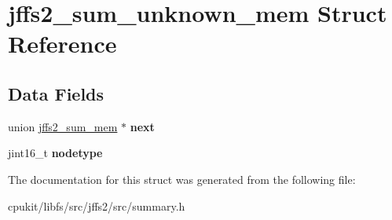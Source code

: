 \hypertarget{structjffs2__sum__unknown__mem}{}\section{jffs2\+\_\+sum\+\_\+unknown\+\_\+mem Struct Reference}
\label{structjffs2__sum__unknown__mem}
\subsection*{Data Fields}
\begin{DoxyCompactItemize}
\item 
\mbox{\label{structjffs2__sum__unknown__mem_a75c6041d8b330f5a0ff68e0cedff107e}} 
union \mbox{\hyperlink{unionjffs2__sum__mem}{jffs2\+\_\+sum\+\_\+mem}} $\ast$ {\bfseries next}
\item 
\mbox{\label{structjffs2__sum__unknown__mem_ad4d332da4bf50da59d339eb37f0ae9f7}} 
jint16\+\_\+t {\bfseries nodetype}
\end{DoxyCompactItemize}


The documentation for this struct was generated from the following file\+:\begin{DoxyCompactItemize}
\item 
cpukit/libfs/src/jffs2/src/summary.\+h\end{DoxyCompactItemize}
